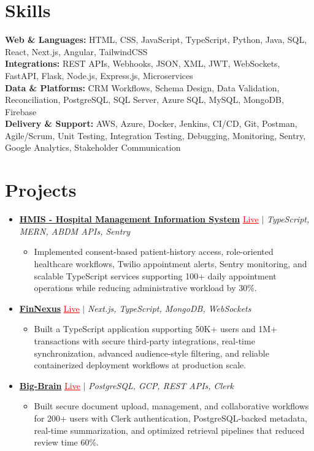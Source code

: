 \documentclass[letterpaper,10pt]{article}
\newcommand{\itemTail}{\vspace{-4pt}}
\newcommand{\sectionGap}{\vspace{-8pt}}
\newcommand{\projGap}{\vspace{3pt}}
\newcommand{\resumeItem}[1]{\item\small{{#1 \itemTail}}}
\newcommand{\resumeProjectHeading}[1]{\item \small #1 \vspace{-2pt}}
\newcommand{\resumeProjectLink}[2]{\href{#1}{\textcolor{red}{\underline{#2}}}}
\newcommand{\resumeSubHeadingListStart}{\begin{itemize}[leftmargin=0.0in, label={}]}
\newcommand{\resumeSubHeadingListEnd}{\end{itemize}}
\newcommand{\resumeProjItemListStart}{\begin{itemize}[leftmargin=0.15in,label=\textbullet,itemsep=3pt,topsep=0pt,parsep=0pt,partopsep=0pt]}
\newcommand{\resumeProjItemListEnd}{\end{itemize}\vspace{-4pt}}
\begin{document}
\section{Skills}
\begin{itemize}[leftmargin=0.15in, label={}]
\small{\item{
\textbf{Web \& Languages:} HTML, CSS, JavaScript, TypeScript, Python, Java, SQL, React, Next.js, Angular, TailwindCSS \\
\textbf{Integrations:} REST APIs, Webhooks, JSON, XML, JWT, WebSockets, FastAPI, Flask, Node.js, Express.js, Microservices \\
\textbf{Data \& Platforms:} CRM Workflows, Schema Design, Data Validation, Reconciliation, PostgreSQL, SQL Server, Azure SQL, MySQL, MongoDB, Firebase \\
\textbf{Delivery \& Support:} AWS, Azure, Docker, Jenkins, CI/CD, Git, Postman, Agile/Scrum, Unit Testing, Integration Testing, Debugging, Monitoring, Sentry, Google Analytics, Stakeholder Communication
}}
\end{itemize}
\sectionGap
\section{Projects}
\resumeSubHeadingListStart
\vspace{-2pt}
\resumeProjectHeading{\href{https://hims-rouge.vercel.app/}{\textbf{HMIS - Hospital Management Information System}} \resumeProjectLink{https://hims-rouge.vercel.app/}{Live} $|$ \emph{TypeScript, MERN, ABDM APIs, Sentry}}
\resumeProjItemListStart
\resumeItem{Implemented consent-based patient-history access, role-oriented healthcare workflows, Twilio appointment alerts, Sentry monitoring, and scalable TypeScript services supporting 100+ daily appointment operations while reducing administrative workload by 30\%.}
\resumeProjItemListEnd
\projGap
\resumeProjectHeading{\href{https://fin-nexus.vercel.app/}{\textbf{FinNexus}} \resumeProjectLink{https://fin-nexus.vercel.app/}{Live} $|$ \emph{Next.js, TypeScript, MongoDB, WebSockets}}
\resumeProjItemListStart
\resumeItem{Built a TypeScript application supporting 50K+ users and 1M+ transactions with secure third-party integrations, real-time synchronization, advanced audience-style filtering, and reliable containerized deployment workflows at production scale.}
\resumeProjItemListEnd
\projGap
\resumeProjectHeading{\href{https://big-brain-pied.vercel.app/}{\textbf{Big-Brain}} \resumeProjectLink{https://big-brain-pied.vercel.app/}{Live} $|$ \emph{PostgreSQL, GCP, REST APIs, Clerk}}
\resumeProjItemListStart
\resumeItem{Built secure document upload, management, and collaborative workflows for 200+ users with Clerk authentication, PostgreSQL-backed metadata, real-time summarization, and optimized retrieval pipelines that reduced review time 60\%.}
\resumeProjItemListEnd
\resumeSubHeadingListEnd
\end{document}

